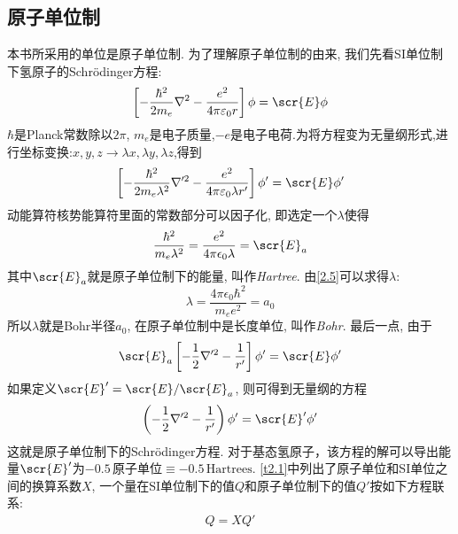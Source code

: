 \subsection{原子单位制}
\label{sec2.1.1}
本书所采用的单位是原子单位制. 
为了理解原子单位制的由来,
我们先看SI单位制下氢原子的Schr\"odinger方程:
\begin{align}
\label{2.3}
\left[-\frac{\hbar^2}{2m_e}\nabla^2-\frac{e^2}{4\pi\varepsilon_0r}\right]\phi=\scr{E}\phi
\end{align}
$ \hbar $是Planck常数除以$ 2\pi $, $ m_e $是电子质量,$ -e $是电子电荷.为将方程变为无量纲形式,进行坐标变换:$x,y,z\to\lambda x,\lambda y,\lambda z$,得到
\begin{equation}
\label{2.4}
\left[-\frac{\hbar^2}{2m_e\lambda^2}\nabla'^2-\frac{e^2}{4\pi\varepsilon_0\lambda r'}\right]\phi'=\scr{E}\phi'
\end{equation}
动能算符核势能算符里面的常数部分可以因子化,
即选定一个$ \lambda $使得
\begin{equation}
\label{2.5}
\frac{\hbar^2}{m_e\lambda^2}=\frac{e^2}{4\pi\epsilon_0\lambda}=\scr{E}_a
\end{equation}
其中$ \scr{E}_a $就是原子单位制下的能量,
叫作\emph{Hartree}.
由\autoref{2.5}可以求得$ \lambda $:
\begin{equation}
\label{2.6}
\lambda=\frac{4\pi\epsilon_0\hbar^2}{m_ee^2}=a_0
\end{equation}
所以$ \lambda $就是Bohr半径$ a_0 $,
在原子单位制中是长度单位,
叫作\emph{Bohr}.
最后一点,
由于
\begin{equation}
\scr{E}_a\left[-\frac{1}{2}\nabla'^2-\frac{1}{r'}\right]\phi'=\scr{E}\phi'	
\end{equation}
如果定义$ \scr{E}'=\scr{E}/\scr{E}_a $,
则可得到无量纲的方程
\begin{equation}
\left(-\frac{1}{2}\nabla'^2-\frac{1}{r'}\right)\phi'=\scr{E}'\phi'
\end{equation}
这就是原子单位制下的Schr\"odinger方程.
对于基态氢原子，该方程的解可以导出能量$ \scr{E}' $为$-0.5\,\text{原子单位}\equiv -0.5\,\text{Hartrees}$. 
\autoref{t2.1}中列出了原子单位和SI单位之间的换算系数$ X $,
一个量在SI单位制下的值$ Q $和原子单位制下的值$ Q' $按如下方程联系:
\begin{eqnarray}
\label{2.9}
Q=XQ'
\end{eqnarray}

